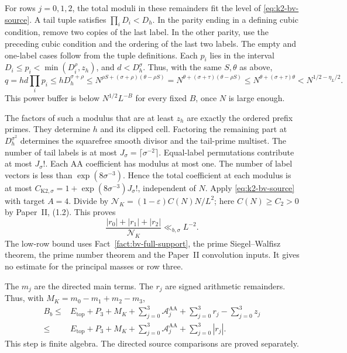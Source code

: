 For rows \(j=0,1,2\), the total moduli in these remainders fit the
level of \eqref{eq:k2-bv-source}. A tail tuple satisfies
\(\prod_iD_i<D_h\). In the parity ending in a defining cubic condition,
remove two copies of the last label. In the other parity, use the
preceding cubic condition and the ordering of the last two labels. The
empty and one-label cases follow from the tuple definitions.
Each \(p_i\) lies in the interval
\(D_i\le p_i<\min(D_i^\rho,z_h)\), and
\(d<D_h^\sigma\). Thus, with the same \(S,\theta\) as above,
\[
 q=h d\prod_i p_i\le hD_h^{\sigma+\rho}
 \le N^{\rho S+(\sigma+\rho)(\theta-\rho S)}
 =N^{\theta+(\sigma+\tau)(\theta-\rho S)}
 \le N^{\theta+(\sigma+\tau)\theta}
 <N^{1/2-\eta_L/2}.
\]
This power buffer is below \(N^{1/2}L^{-B}\) for every fixed \(B\),
once \(N\) is large enough.

The factors of such a modulus that are at least \(z_h\) are exactly the
ordered prefix primes. They determine \(h\) and its clipped cell.
Factoring the remaining part at \(D_h^{\sigma^2}\) determines the
squarefree smooth divisor and the tail-prime multiset. The number of
tail labels is at most \(J_\sigma=\lceil\sigma^{-2}\rceil\).
Equal-label permutations contribute at most \(J_\sigma!\). Each
AA coefficient has modulus at most one. The number of label vectors
is less than \(\exp(8\sigma^{-3})\). Hence the total coefficient at each
modulus is at most
\(C_{\mathrm{K2},\sigma}=1+\exp(8\sigma^{-3})J_\sigma!\), independent of \(N\).
Apply \eqref{eq:k2-bv-source} with target \(A=4\). Divide by
\(\mathcal N_K=(1-\varepsilon)C(N)N/L^2\); here \(C(N)\ge C_2>0\)
by Paper~II, (1.2). This proves
\begin{equation}\label{eq:k2-low-row-remainders}
 \frac{|r_0|+|r_1|+|r_2|}{\mathcal N_K}\ll_{b,\sigma}L^{-2}.
\end{equation}
The low-row bound uses Fact~\ref{fact:bv-full-support}, the
prime Siegel--Walfisz theorem, the prime number theorem and the Paper~II
convolution inputs. It gives no estimate for the principal
masses or row three.

The \(m_j\) are the directed main terms.
The \(r_j\) are signed arithmetic remainders.
Thus, with \(M_K=m_0-m_1+m_2-m_3\),
\begin{equation}\label{eq:k2-signed-join}
\begin{aligned}
 B_b\le{}&E_{\mathrm{top}}+P_3+M_K
       +\sum_{j=0}^3\mathcal A_j^{\mathrm{AA}}+\sum_{j=0}^3r_j-\sum_{j=0}^3z_j\\
 \le{}&E_{\mathrm{top}}+P_3+M_K
       +\sum_{j=0}^3\mathcal A_j^{\mathrm{AA}}+\sum_{j=0}^3|r_j|.
\end{aligned}
\end{equation}
This step is finite algebra.
The directed source comparisons are proved separately.

